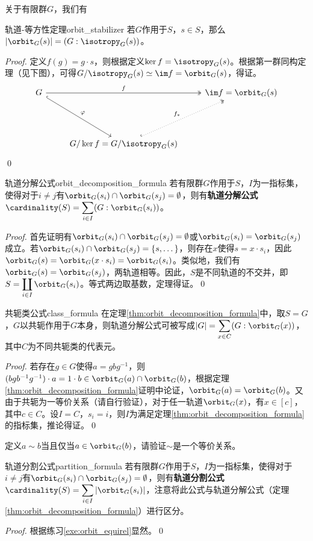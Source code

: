 \documentclass[../main.tex]{subfiles}
\begin{document}
关于有限群$G$，我们有
\begin{proposition}{轨道-等方性定理}{orbit_stabilizer}
若$G$作用于$S$，$s\in S$，那么$|\orbit_G(s)|=(G:\isotropy_G(s))$。
\end{proposition}
\begin{proof}
定义$f(g)=g\cdot s$，则根据定义$\ker f=\isotropy_G(s)$。根据第一群同构定理（见下图），可得$G/\isotropy_G(s)\simeq\im f=\orbit_G(s)$，得证。
$$\begin{tikzcd}
G \arrow[rdd, "\varphi", hook] \arrow[rr, "f", two heads] & {} & \im f=\orbit_G(s) \\ {} & {} & {}\\ {} & G/\ker f=G/\isotropy_G(s) \arrow[ruu, "f_*", two heads, dotted, hook] & {}
\end{tikzcd}$$
\qed
\end{proof}
\begin{theorem}{轨道分解公式}{orbit_decomposition_formula}
若有限群$G$作用于$S$，$I$为一指标集，使得对于$i\neq j$有$\orbit_G(s_i)\cap\orbit_G(s_j)=\emptyset$，则有\textbf{轨道分解公式}$\displaystyle\cardinality(S)=\sum_{i\in I}(G:\orbit_G(s_i))$。
\end{theorem}
\begin{proof}
首先证明有$\orbit_G(s_i)\cap\orbit_G(s_j)=\emptyset$或$\orbit_G(s_i)=\orbit_G(s_j)$成立。若$\orbit_G(s_i)\cap\orbit_G(s_j)=\{s,\dots\}$，则存在$x$使得$s=x\cdot s_i$，因此$\orbit_G(s)=\orbit_G(x\cdot s_i)=\orbit_G(s_i)$。类似地，我们有$\orbit_G(s)=\orbit_G(s_j)$，两轨道相等。因此，$S$是不同轨道的不交并，即$\displaystyle S=\coprod_{i\in I}\orbit_G(s_i)$。等式两边取基数，定理得证。\qed
\end{proof}
\begin{corollary}{共轭类公式}{class_formula}
在定理\ref{thm:orbit_decomposition_formula}中，取$S=G$，$G$以共轭作用于$G$本身，则轨道分解公式可被写成$\displaystyle|G|=\sum_{x\in C}(G:\orbit_G(x))$，其中$C$为不同共轭类的代表元。
\end{corollary}
\begin{proof}
若存在$g\in G$使得$a=gbg^{-1}$，则$(bgb^{-1}g^{-1})\cdot a=1\cdot b\in\orbit_G(a)\cap\orbit_G(b)$，根据定理\ref{thm:orbit_decomposition_formula}证明中论证，$\orbit_G(a)=\orbit_G(b)$。又由于共轭为一等价关系（请自行验证），对于任一轨道$\orbit_G(x)$，有$x\in[c]$，其中$c\in C$。设$I=C$，$s_i=i$，则$I$为满足定理\ref{thm:orbit_decomposition_formula}的指标集，推论得证。\qed
\end{proof}
\begin{exercise}\label{exe:orbit_equirel}
定义$a\sim b$当且仅当$a\in\orbit_G(b)$，请验证$\sim$是一个等价关系。
\end{exercise}
\begin{theorem}{轨道分割公式}{partition_formula}
若有限群$G$作用于$S$，$I$为一指标集，使得对于$i\neq j$有$\orbit_G(s_i)\cap\orbit_G(s_j)=\emptyset$，则有\textbf{轨道分割公式}$\displaystyle\cardinality(S)=\sum_{i\in I}|\orbit_G(s_i)|$，注意将此公式与轨道分解公式（定理\ref{thm:orbit_decomposition_formula}）进行区分。
\end{theorem}
\begin{proof}
根据练习\ref{exe:orbit_equirel}显然。\qed
\end{proof}
\end{document}
